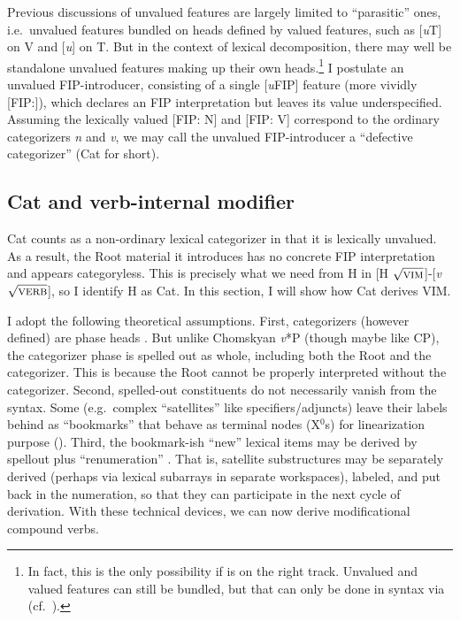 \documentclass[output=paper]{langsci/langscibook}
\begin{document}
Previous discussions of unvalued features are largely limited to ``parasitic''
ones, i.e.\ unvalued features bundled on heads defined by valued features, such
as [{\em u}T] on V and [{\em u}{\textphi}] on T.
But in the context of lexical decomposition, there may well be standalone
unvalued features making up their own heads.\footnote{In fact, this is the only
possibility if \citet{Collins2017} is on the right track. Unvalued and valued
features can still be bundled, but that can only be done in syntax via 
(cf.\ ).} I postulate an unvalued FIP-introducer, consisting of a
single [{\em u}FIP] feature (more vividly [FIP:\underline{\hspace{3mm}}]),
which declares an \gls{FIP} interpretation but leaves its value underspecified.
Assuming the lexically valued [FIP: N] and [FIP: V] correspond to the ordinary
categorizers {\em n} and {\em v}, we may call the unvalued FIP-introducer a
``defective categorizer'' (Cat for short).

\subsection{Cat and verb-internal modifier}\label{sec4.3}

Cat counts as a non-ordinary lexical categorizer in that it is lexically
unvalued. As a result, the Root material it introduces has no concrete \gls{FIP}
interpretation and appears categoryless. This is precisely what we need from H
in [H {$\sqrt{\textrm{\textsc{vim}}}$}]-[{\em v}
{$\sqrt{\textrm{\textsc{verb}}}$}], so I identify H as Cat. In this section, I
will show how Cat derives \gls{VIM}.

I adopt the following theoretical assumptions. First, categorizers (however
defined) are phase heads \citep[\`{a} la][]{Marantz2001b}. But unlike Chomskyan
{\em v}*P (though maybe like CP), the categorizer phase is spelled out as
whole, including both the Root and the categorizer. This is because the Root
cannot be properly interpreted without the categorizer. Second, spelled-out
constituents do not necessarily vanish from the syntax. Some (e.g.\ complex
``satellites'' like specifiers/adjuncts) leave their labels behind as
``bookmarks'' that behave as terminal nodes (X$^0$s) for linearization purpose
(\citealt{NunesUriagereka2000,Fowlie2013}). Third, the bookmark-ish
``new'' lexical items may be derived by spellout plus ``renumeration''
\citep{Johnson2003}. That is, satellite substructures may be separately derived
(perhaps via lexical subarrays in separate workspaces), labeled, and put back
in the numeration, so that they can participate in the next cycle of
derivation. With these technical devices, we can now derive modificational
compound verbs.
\end{document}
